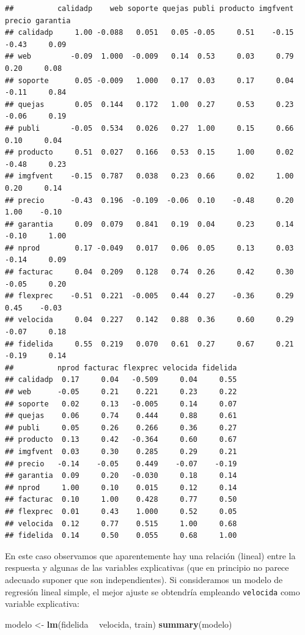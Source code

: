 \documentclass[
  spanish,
]{book}
\newenvironment{Shaded}{\begin{snugshade}}{\end{snugshade}}
\newcommand{\KeywordTok}[1]{\textcolor[rgb]{0.13,0.29,0.53}{\textbf{#1}}}
\newcommand{\NormalTok}[1]{#1}
\newcommand{\OperatorTok}[1]{\textcolor[rgb]{0.81,0.36,0.00}{\textbf{#1}}}
\newcommand{\StringTok}[1]{\textcolor[rgb]{0.31,0.60,0.02}{#1}}
\theoremstyle{break}
\theoremstyle{definition}
\theoremstyle{definition}
\theoremstyle{definition}
\theoremstyle{remark}
\begin{document}
\begin{verbatim}
##          calidadp    web soporte quejas publi producto imgfvent precio garantia
## calidadp     1.00 -0.088   0.051   0.05 -0.05     0.51    -0.15  -0.43     0.09
## web         -0.09  1.000  -0.009   0.14  0.53     0.03     0.79   0.20     0.08
## soporte      0.05 -0.009   1.000   0.17  0.03     0.17     0.04  -0.11     0.84
## quejas       0.05  0.144   0.172   1.00  0.27     0.53     0.23  -0.06     0.19
## publi       -0.05  0.534   0.026   0.27  1.00     0.15     0.66   0.10     0.04
## producto     0.51  0.027   0.166   0.53  0.15     1.00     0.02  -0.48     0.23
## imgfvent    -0.15  0.787   0.038   0.23  0.66     0.02     1.00   0.20     0.14
## precio      -0.43  0.196  -0.109  -0.06  0.10    -0.48     0.20   1.00    -0.10
## garantia     0.09  0.079   0.841   0.19  0.04     0.23     0.14  -0.10     1.00
## nprod        0.17 -0.049   0.017   0.06  0.05     0.13     0.03  -0.14     0.09
## facturac     0.04  0.209   0.128   0.74  0.26     0.42     0.30  -0.05     0.20
## flexprec    -0.51  0.221  -0.005   0.44  0.27    -0.36     0.29   0.45    -0.03
## velocida     0.04  0.227   0.142   0.88  0.36     0.60     0.29  -0.07     0.18
## fidelida     0.55  0.219   0.070   0.61  0.27     0.67     0.21  -0.19     0.14
##          nprod facturac flexprec velocida fidelida
## calidadp  0.17     0.04   -0.509     0.04     0.55
## web      -0.05     0.21    0.221     0.23     0.22
## soporte   0.02     0.13   -0.005     0.14     0.07
## quejas    0.06     0.74    0.444     0.88     0.61
## publi     0.05     0.26    0.266     0.36     0.27
## producto  0.13     0.42   -0.364     0.60     0.67
## imgfvent  0.03     0.30    0.285     0.29     0.21
## precio   -0.14    -0.05    0.449    -0.07    -0.19
## garantia  0.09     0.20   -0.030     0.18     0.14
## nprod     1.00     0.10    0.015     0.12     0.14
## facturac  0.10     1.00    0.428     0.77     0.50
## flexprec  0.01     0.43    1.000     0.52     0.05
## velocida  0.12     0.77    0.515     1.00     0.68
## fidelida  0.14     0.50    0.055     0.68     1.00
\end{verbatim}

En este caso observamos que aparentemente hay una relación (lineal) entre la respuesta y algunas de las variables explicativas (que en principio no parece adecuado suponer que son independientes).
Si consideramos un modelo de regresión lineal simple, el mejor ajuste se obtendría empleando \texttt{velocida} como variable explicativa:

\begin{Shaded}
\begin{Highlighting}[]
\NormalTok{modelo <-}\StringTok{ }\KeywordTok{lm}\NormalTok{(fidelida }\OperatorTok{~}\StringTok{ }\NormalTok{velocida, train)}
\KeywordTok{summary}\NormalTok{(modelo)}
\end{Highlighting}
\end{Shaded}
\end{document}
